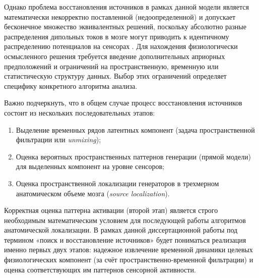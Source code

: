 Однако проблема восстановления источников в рамках данной модели является математически некорректно поставленной (недоопределенной) и допускает бесконечное множество эквивалентных решений, поскольку абсолютно разные распределения дипольных токов в мозге могут приводить к идентичному распределению потенциалов на сенсорах \cite{parra2005recipes, ilmoniemi2019brain}. Для нахождения физиологически осмысленного решения требуется введение дополнительных априорных предположений и ограничений на пространственную, временную или статистическую структуру данных. Выбор этих ограничений определяет специфику конкретного алгоритма анализа. 

Важно подчеркнуть, что в общем случае процесс восстановления источников состоит из нескольких последовательных этапов:
\begin{enumerate}
	\item Выделение временных рядов латентных компонент (задача пространственной фильтрации или \textit{unmixing});
	\item Оценка вероятных пространственных паттернов генерации (прямой модели) для выделенных компонент на уровне сенсоров;
	\item Оценка пространственной локализации генераторов в трехмерном анатомическом объеме мозга (\textit{source localization}).
\end{enumerate}

Корректная оценка паттерна активации (второй этап) является строго необходимым математическим условием для последующей работы алгоритмов анатомической локализации. В рамках данной диссертационной работы под термином «поиск и восстановление источников» будет пониматься реализация именно первых двух этапов: надежное извлечение временной динамики целевых физиологических компонент (за счёт пространственно-временной фильтрации) и оценка соответствующих им паттернов сенсорной активности.

